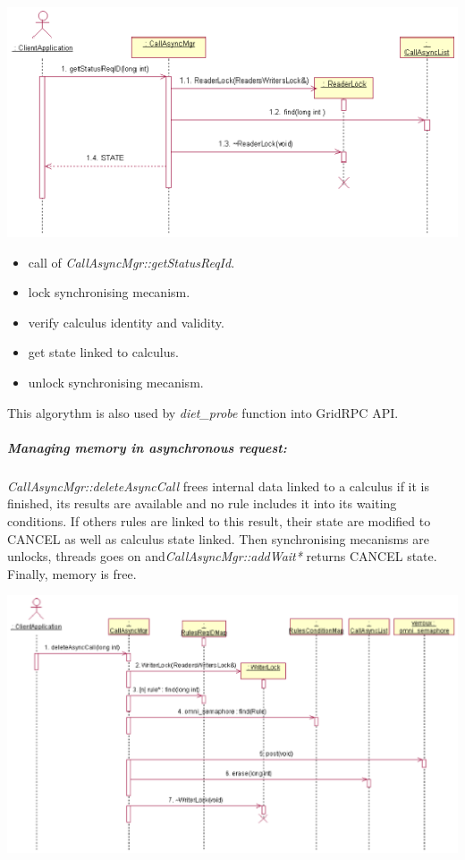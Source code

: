  \begin{center}
  \includegraphics{./fig/CallAsyncProbeSequenceDiagram1.ps}
  \end{center}

  \begin{itemize}
  \item call of \emph{CallAsyncMgr::getStatusReqId}.
  \item lock synchronising mecanism.
  \item verify calculus identity and validity.
  \item get state linked to calculus.
  \item unlock synchronising mecanism.
  \end{itemize}

  \noindent
   This algorythm is also used by \emph{diet\_probe} function
  into GridRPC API.

  \subparagraph{Managing memory in asynchronous request:}
  \emph{CallAsyncMgr::deleteAsyncCall} frees internal data linked to a 
  calculus if it is finished, its results are available and no rule includes
  it into its waiting conditions.
  If others rules are linked to this result, their state are modified to 
  CANCEL as well as calculus state linked. Then synchronising mecanisms
  are unlocks, threads goes on and\emph{CallAsyncMgr::addWait*} returns
  CANCEL state. Finally, memory is free.

  \begin{center}
  \includegraphics{./fig/DietCancelSequenceDiagram.ps}
  \end{center}

